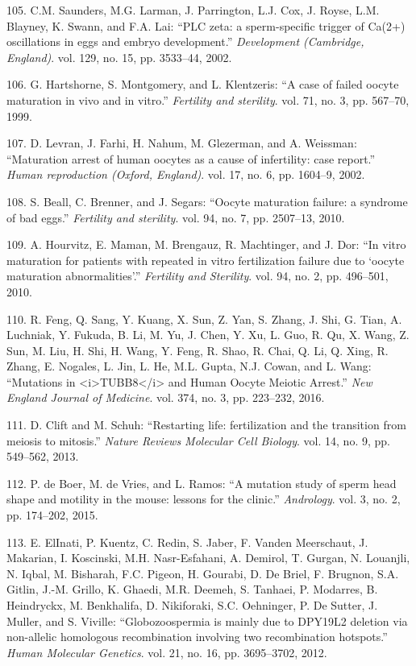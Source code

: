 \documentclass[12pt,a4paper,twoside]{ugathesis}
\theoremstyle{definition}
\theoremstyle{definition}
\theoremstyle{definition}
\theoremstyle{remark}
\begin{document}
\hypertarget{ref-Saunders2002}{}
105. C.M. Saunders, M.G. Larman, J. Parrington, L.J. Cox, J. Royse, L.M.
Blayney, K. Swann, and F.A. Lai: ``PLC zeta: a sperm-specific trigger of
Ca(2+) oscillations in eggs and embryo development.'' \emph{Development
(Cambridge, England)}. vol. 129, no. 15, pp. 3533--44, 2002.

\hypertarget{ref-Hartshorne1999}{}
106. G. Hartshorne, S. Montgomery, and L. Klentzeris: ``A case of failed
oocyte maturation in vivo and in vitro.'' \emph{Fertility and
sterility}. vol. 71, no. 3, pp. 567--70, 1999.

\hypertarget{ref-Levran2002}{}
107. D. Levran, J. Farhi, H. Nahum, M. Glezerman, and A. Weissman:
``Maturation arrest of human oocytes as a cause of infertility: case
report.'' \emph{Human reproduction (Oxford, England)}. vol. 17, no. 6,
pp. 1604--9, 2002.

\hypertarget{ref-Beall2010}{}
108. S. Beall, C. Brenner, and J. Segars: ``Oocyte maturation failure: a
syndrome of bad eggs.'' \emph{Fertility and sterility}. vol. 94, no. 7,
pp. 2507--13, 2010.

\hypertarget{ref-Hourvitz2010}{}
109. A. Hourvitz, E. Maman, M. Brengauz, R. Machtinger, and J. Dor: ``In
vitro maturation for patients with repeated in vitro fertilization
failure due to `oocyte maturation abnormalities'.'' \emph{Fertility and
Sterility}. vol. 94, no. 2, pp. 496--501, 2010.

\hypertarget{ref-Feng2016}{}
110. R. Feng, Q. Sang, Y. Kuang, X. Sun, Z. Yan, S. Zhang, J. Shi, G.
Tian, A. Luchniak, Y. Fukuda, B. Li, M. Yu, J. Chen, Y. Xu, L. Guo, R.
Qu, X. Wang, Z. Sun, M. Liu, H. Shi, H. Wang, Y. Feng, R. Shao, R. Chai,
Q. Li, Q. Xing, R. Zhang, E. Nogales, L. Jin, L. He, M.L. Gupta, N.J.
Cowan, and L. Wang: ``Mutations in
\textless{}i\textgreater{}TUBB8\textless{}/i\textgreater{} and Human
Oocyte Meiotic Arrest.'' \emph{New England Journal of Medicine}. vol.
374, no. 3, pp. 223--232, 2016.

\hypertarget{ref-Clift2013}{}
111. D. Clift and M. Schuh: ``Restarting life: fertilization and the
transition from meiosis to mitosis.'' \emph{Nature Reviews Molecular
Cell Biology}. vol. 14, no. 9, pp. 549--562, 2013.

\hypertarget{ref-DeBoer2015}{}
112. P. de Boer, M. de Vries, and L. Ramos: ``A mutation study of sperm
head shape and motility in the mouse: lessons for the clinic.''
\emph{Andrology}. vol. 3, no. 2, pp. 174--202, 2015.

\hypertarget{ref-ElInati2012}{}
113. E. ElInati, P. Kuentz, C. Redin, S. Jaber, F. Vanden Meerschaut, J.
Makarian, I. Koscinski, M.H. Nasr-Esfahani, A. Demirol, T. Gurgan, N.
Louanjli, N. Iqbal, M. Bisharah, F.C. Pigeon, H. Gourabi, D. De Briel,
F. Brugnon, S.A. Gitlin, J.-M. Grillo, K. Ghaedi, M.R. Deemeh, S.
Tanhaei, P. Modarres, B. Heindryckx, M. Benkhalifa, D. Nikiforaki, S.C.
Oehninger, P. De Sutter, J. Muller, and S. Viville: ``Globozoospermia is
mainly due to DPY19L2 deletion via non-allelic homologous recombination
involving two recombination hotspots.'' \emph{Human Molecular Genetics}.
vol. 21, no. 16, pp. 3695--3702, 2012.
\end{document}
